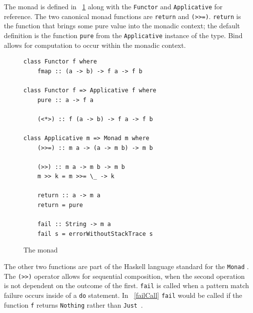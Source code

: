 The monad \DIFdelbegin {}\DIFdelend \DIFaddbegin {}\DIFaddend is defined in \DIFdelbegin {}\DIFdelend \DIFaddbegin {}\DIFaddend ~\ref{monadDef} along with the \texttt{Functor} and \texttt{Applicative} \DIFdelbegin {}\DIFdelend \DIFaddbegin {}\DIFaddend for reference. The two canonical monad functions are \texttt{return} and \DIFdelbegin {}\DIFdelend \DIFaddbegin {}\DIFaddend \texttt{(>>=)}\DIFdelbegin \DIFdel{)}\DIFdelend \DIFaddbegin {}\DIFaddend . \texttt{return} is the function that brings some pure value into the monadic context; the default definition is the function \texttt{pure} from the \texttt{Applicative} instance of the type. Bind allows for computation to occur within the monadic context.

\begin{figure}[t]
\begin{lstlisting}
class Functor f where
	fmap :: (a -> b) -> f a -> f b

class Functor f => Applicative f where
	pure :: a -> f a

	(<*>) :: f (a -> b) -> f a -> f b

class Applicative m => Monad m where
	(>>=) :: m a -> (a -> m b) -> m b

	(>>) :: m a -> m b -> m b
	m >> k = m >>= \_ -> k

	return :: a -> m a
	return = pure

	fail :: String -> m a
	fail s = errorWithoutStackTrace s
\end{lstlisting}
\caption{The monad \DIFdelbeginFL {}\DIFdelendFL \DIFaddbeginFL {}\DIFaddendFL }
\label{monadDef}
\end{figure}

The other two functions are part of the Haskell language standard for the \texttt{Monad} \DIFdelbegin {}\DIFdelend \DIFaddbegin {}\DIFaddend . The \texttt{(>>)} operator allows for sequential composition, when the second operation is not dependent on the outcome of the first. \texttt{fail} is called when a pattern match failure occurs inside of a \texttt{do} statement. In \DIFdelbegin {}\DIFdelend \DIFaddbegin {}\DIFaddend ~\ref{failCall} \texttt{fail} would be called if the function \texttt{f} returns \DIFdelbegin {}\DIFdelend \texttt{Nothing} rather than \DIFdelbegin {}\DIFdelend \DIFaddbegin \DIFadd{(}\DIFaddend \texttt{Just \DIFaddbegin {}\DIFaddend }\DIFaddbegin {}\texttt{}\DIFaddend .

